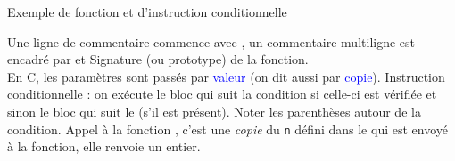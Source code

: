 \documentclass[10pt]{beamer}
\begin{document}
\begin{frame}{\Ctitle}{\stitle}
	\begin{exampleblock}{Exemple de fonction et d'instruction conditionnelle}
		\begin{overprint}
		\medskip
		{\small Une ligne de commentaire commence avec \kw{//}, un commentaire multiligne est encadré par \kw{/*} et \kw{*/}}
		\onslide<2>
		\medskip
		{\small Signature (ou prototype) de la fonction. \\
		\textcolor{BrickRed}{\important} En C, les paramètres sont passés par \textcolor{blue}{valeur} (on dit aussi par \textcolor{blue}{copie}).}
		\onslide<3>
		\medskip
		{\small Instruction conditionnelle : on exécute le bloc qui suit la condition si celle-ci est vérifiée et sinon le bloc qui suit le  (s'il est présent).
		Noter les parenthèses autour de la condition.}
		\onslide<4>
		\medskip
		{\small Appel à la fonction , c'est une \textit{copie} du {\tt n} défini dans le  qui est envoyé à la fonction, elle renvoie un entier.}
		\end{overprint}
	\end{exampleblock}
\end{frame}
\end{document}
